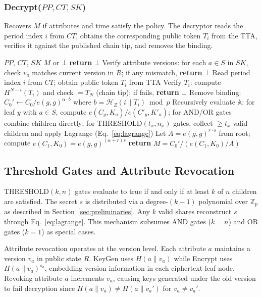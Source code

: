 ﻿\documentclass[lettersize,journal]{IEEEtran}
\begin{document}
\subsubsection{Decrypt($PP, CT, SK$)}

Recovers $M$ if attributes and time satisfy the policy. The decryptor
reads the period index $i$ from $CT$, obtains the corresponding public
token $T_i$ from the TTA, verifies it against the published chain tip,
and removes the binding.

\begin{algorithm}[t]
\caption{Decryption}
\label{alg:decryption}
\begin{algorithmic}[1]
\REQUIRE $PP$, $CT$, $SK$
\ENSURE $M$ or $\bot$
 \STATE \textbf{return} $\bot$ \ENDIF
\STATE Verify attribute versions: for each $a \in S$ in $SK$, check $v_a$ matches current version in $R$; if any mismatch, \textbf{return} $\bot$
\STATE Read period index $i$ from $CT$; obtain public token $T_i$ from TTA
\STATE Verify $T_i$: compute $H^{N-i}(T_i)$ and check $= T_N$ (chain tip); if fails, \textbf{return} $\bot$
\STATE Remove binding: $C_0' \leftarrow C_0 / e(g,g)^{\alpha \cdot b}$ where $b = \mathcal{H}_Z(i \| T_i) \bmod p$
\STATE Recursively evaluate $\mathbb{A}$: for leaf $y$ with $a \in S$, compute $e(C_y, K_a) / e(C'_y, K'_a)$; for AND/OR gates combine children directly; for THRESHOLD$(t_x,n_x)$ gates, collect $\geq t_x$ valid children and apply Lagrange (Eq.~\ref{eq:lagrange})
\STATE Let $A = e(g,g)^{r \cdot s}$ from root; compute $e(C_1, K_0) = e(g,g)^{(\alpha+r) s}$
\STATE \textbf{return} $M = C_0' / (e(C_1, K_0) / A)$
\end{algorithmic}
\end{algorithm}

\subsection{Threshold Gates and Attribute Revocation}
\label{subsec:threshold_revocation}

THRESHOLD$(k,n)$ gates evaluate to true if and only if at least $k$ of
$n$ children are satisfied. The secret $s$ is distributed via a
degree-$(k{-}1)$ polynomial over $\mathbb{Z}_p$ as described in
Section~\ref{sec:preliminaries}. Any $k$ valid shares reconstruct $s$
through Eq.~\eqref{eq:lagrange}. This mechanism subsumes AND gates
($k{=}n$) and OR gates ($k{=}1$) as special cases.

Attribute revocation operates at the version level. Each attribute $a$
maintains a version $v_a$ in public state $R$. KeyGen uses $H(a \|
v_a)$ while Encrypt uses $H(a \| v_a)^{s_a}$, embedding version
information in each ciphertext leaf node. Revoking attribute $a$
increments $v_a$, causing keys generated under the old version to fail
decryption since $H(a \| v_a) \neq H(a \| v_a')$ for $v_a \neq v_a'$.
\end{document}
